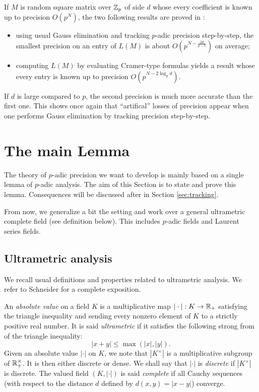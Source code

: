 \documentclass{lms}
\begin{document}
If $M$ is random square matrix over $\mathbb Z_p$ of side $d$ whose every
coefficient is known up to precision $O(p^N)$, the two following
results are proved in \cite{Caruso}:
\begin{itemize}
\item using usual Gauss elimination and tracking $p$-adic precision 
step-by-step, the smallest precision on an entry of $L(M)$ is about
$O(p^{N - \frac{2d}{p-1}})$ on average;
\item computing $L(M)$ by evaluating Cramer-type formulas yields a
result whose every entry is known up to precision $O(p^{N - 2 \log_p 
d})$.
\end{itemize}
If $d$ is large compared to $p$, the second precision is much more
accurate than the first one. This shows once again that ``artifical''
losses of precision appear when one performs Gauss elimination by
tracking precision step-by-step.


\section{The main Lemma}
\label{sec:mainlemma}

The theory of $p$-adic precision we want to develop is mainly based 
on a single lemma of $p$-adic analysis. The aim of this Section is
to state and prove this lemma. Consequences will be discussed after
in Section \ref{sec:tracking}.

From now, we generalize a bit the setting and work over a general 
ultrametric complete field (see definition below). This includes 
$p$-adic fields and Laurent series fields.

\subsection{Ultrametric analysis}
\label{ssec:ultrametric}

We recall usual definitions and properties related to ultrametric 
analysis. We refer to Schneider \cite{Schneider} for a complete 
exposition.

An \emph{absolute value} on a field $K$ is a multiplicative map $|\cdot| 
: K \to \mathbb R_+$ satisfying the triangle inequality and sending every 
nonzero element of $K$ to a strictly positive real number. It is said 
\emph{ultrametric} if it satisfies the following strong from of the 
triangle inequality:
$$|x+y| \leq \max(|x|, |y|).$$
Given an absolute value $|\cdot|$ on $K$, we note that $|K^\times|$ is a 
multiplicative subgroup of $\mathbb R_+^\times$. It is then either discrete or 
dense. We shall say that $|\cdot|$ is \emph{discrete} if $|K^\times|$ is
discrete. The valued field $(K, |\cdot|)$ is said \emph{complete} if all 
Cauchy sequences (with respect to the distance $d$ defined by $d(x,y) = 
|x-y|$) converge.
\end{document}
